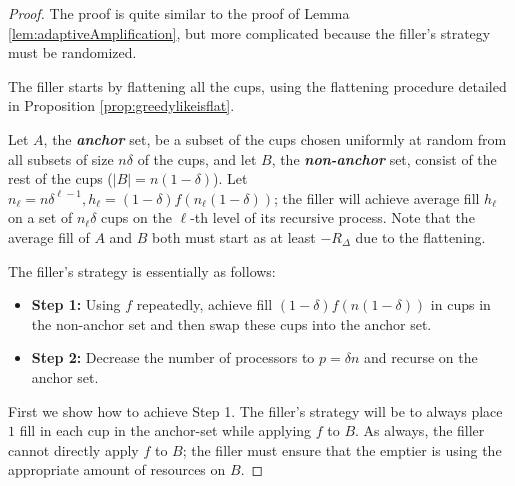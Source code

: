 \documentclass[twocolumn]{article}[10pt]
\newcommand{\defn}[1]{{\textit{\textbf{\boldmath #1}}}\xspace}
\begin{document}
\begin{proof}
  The proof is quite similar to the proof of Lemma
  \ref{lem:adaptiveAmplification}, but more complicated because the filler's
  strategy must be randomized.

  The filler starts by flattening all the cups, using the flattening procedure
  detailed in Proposition \ref{prop:greedylikeisflat}. 

  Let $A$, the \defn{anchor} set, be a subset of the cups chosen uniformly at
  random from all subsets of size $n\delta$ of the cups, and let $B$, the
  \defn{non-anchor} set, consist of the rest of the cups ($|B| = n(1-\delta)$).
  Let $n_\ell = n\delta^{\ell-1}, h_\ell = (1-\delta)f(n_\ell(1-\delta))$; the
  filler will achieve average fill $h_\ell$ on a set of $n_\ell\delta$ cups on
  the $\ell$-th level of its recursive process. Note that the average fill of
  $A$ and $B$ both must start as at least $-R_\Delta$ due to the flattening.

  The filler's strategy is essentially as follows:
  \begin{itemize}
    \item \textbf{Step 1:} Using $f$ repeatedly, achieve fill
      $(1-\delta)f(n(1-\delta))$ in cups in the non-anchor set and then swap
      these cups into the anchor set.  
    \item \textbf{Step 2:} Decrease the number of processors to $p=\delta n$
      and recurse on the anchor set.
  \end{itemize}

  First we show how to achieve Step 1. 
  The filler's strategy will be to always place $1$ fill in each cup in the
  anchor-set while applying $f$ to $B$.
  As always, the filler cannot directly apply $f$ to $B$; the filler must ensure that
  the emptier is using the appropriate amount of resources on $B$.


\end{proof}
\end{document}
